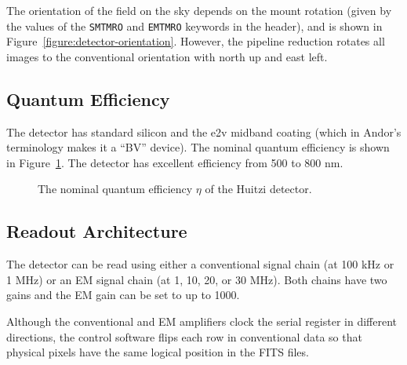 The orientation of the field on the sky depends on the mount rotation (given by the values of the \verb|SMTMRO| and \verb|EMTMRO| keywords in the header), and is shown in Figure~\ref{figure:detector-orientation}. However, the pipeline reduction rotates all images to the conventional orientation with north up and east left.

\subsection{Quantum Efficiency}

The detector has standard silicon and the e2v midband coating (which in Andor's terminology makes it a “BV” device). The nominal quantum efficiency is shown in Figure~\ref{figure:detector-quantum-efficiency}. The detector has excellent efficiency from 500 to 800 nm.

\begin{figure}
\begin{center}
\end{center}
\caption{The nominal quantum efficiency $\eta$ of the Huitzi detector.}
\label{figure:detector-quantum-efficiency}
\end{figure}


\subsection{Readout Architecture}

The detector can be read using either a conventional signal chain (at 100 kHz or 1 MHz) or an EM signal chain (at 1, 10, 20, or 30 MHz). Both chains have two gains and the EM gain can be set to up to 1000. 

Although the conventional and EM amplifiers clock the serial register in different directions, the control software flips each row in conventional data so that physical pixels have the same logical position in the FITS files.

